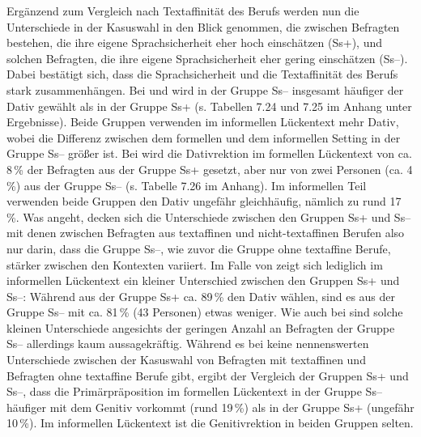 Ergänzend zum Vergleich nach Textaffinität des Berufs werden nun die Unterschiede in der Kasuswahl in den Blick genommen, die zwischen Befragten bestehen, die ihre eigene Sprachsicherheit eher hoch einschätzen (Ss+), und solchen Befragten, die ihre eigene Sprachsicherheit eher gering einschätzen (Ss--). 
Dabei bestätigt sich, dass die Sprachsicherheit und die Textaffinität des Berufs stark zusammenhängen.
Bei \wegen{} und \waehrend{} wird in der Gruppe Ss-- insgesamt häufiger der Dativ gewählt als in der Gruppe Ss+ (s. Tabellen 7.24 und 7.25 im Anhang unter Ergebnisse). 
Beide Gruppen verwenden im informellen Lückentext mehr Dativ, wobei die Differenz zwischen dem formellen und dem informellen Setting in der Gruppe Ss-- größer ist. 
Bei \dank{} wird die Dativrektion im formellen Lückentext von ca. 8\,\% der Befragten aus der Gruppe Ss+ gesetzt, aber nur von zwei Personen (ca. 4\,\%) aus der Gruppe Ss-- (s. Tabelle 7.26 im Anhang).
Im informellen Teil verwenden beide Gruppen den Dativ ungefähr gleichhäufig, nämlich zu rund 17\,\%. 
Was \dank{} angeht, decken sich die Unterschiede zwischen den Gruppen Ss+ und Ss-- mit denen zwischen Befragten aus textaffinen und nicht-textaffinen Berufen also nur darin, dass die Gruppe Ss--, wie zuvor die Gruppe ohne textaffine Berufe, stärker zwischen den Kontexten variiert. 
Im Falle von \gegenueber{} zeigt sich lediglich im informellen Lückentext ein kleiner Unterschied zwischen den Gruppen Ss+ und Ss--:
Während aus der Gruppe Ss+ ca. 89\,\% den Dativ wählen, sind es aus der Gruppe Ss-- mit ca. 81\,\% (43 Personen) etwas weniger. 
Wie auch bei \dank{} sind solche kleinen Unterschiede angesichts der geringen Anzahl an Befragten der Gruppe Ss-- allerdings kaum aussagekräftig.
Während es bei  keine nennenswerten Unterschiede zwischen der Kasuswahl von Befragten mit textaffinen und Befragten ohne textaffine Berufe gibt, ergibt der Vergleich der Gruppen Ss+ und Ss--, dass die Primärpräposition im formellen Lückentext in der Gruppe Ss-- häufiger mit dem Genitiv vorkommt (rund 19\,\%) als in der Gruppe Ss+ (ungefähr 10\,\%).
Im informellen Lückentext ist die Genitivrektion in beiden Gruppen selten. 

